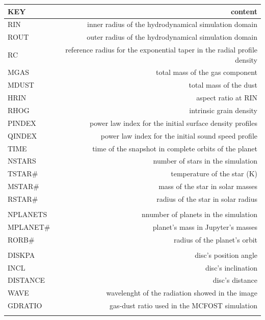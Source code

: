 \documentclass[a4paper,10pt]{report}
\begin{document}
\begin{table}
    \begin{center}
        \begin{tabular}{l r}
        \toprule
        KEY & content \\
        \midrule   
        RIN & inner radius of the hydrodynamical simulation domain\\
        ROUT & outer radius of the hydrodynamical simulation domain\\
        RC & reference radius for the exponential taper in the radial profile density\\ 
        MGAS & total mass of the gas component\\
        MDUST & total mass of the dust\\
        HRIN & aspect ratio at RIN \\ 
        RHOG & intrinsic grain density\\ 
        PINDEX & power law index for the initial surface density profiles\\
        QINDEX & power law index for the initial sound speed profile \\
        TIME & time of the snapshot in complete orbits of the planet \\

        NSTARS & number of stars in the simulation \\
        TSTAR\# & temperature of the star (K)\\
        MSTAR\# & mass of the star in solar masses \\
        RSTAR\# & radius of the star in solar radius \\ \\
        
        NPLANETS & nnumber of planets in the simulation\\
        MPLANET\# & planet's mass in Jupyter's masses \\
        RORB\# & radius of the planet's orbit\\ \\
        
        DISKPA & disc's position angle\\
        INCL & disc's inclination\\
        DISTANCE & disc's distance \\
        WAVE & wavelenght of the radiation showed in the image\\
        GDRATIO & gas-dust ratio used in the MCFOST simulation \\ \\


\end{tabular}
\end{center}
\end{table}
\end{document}
